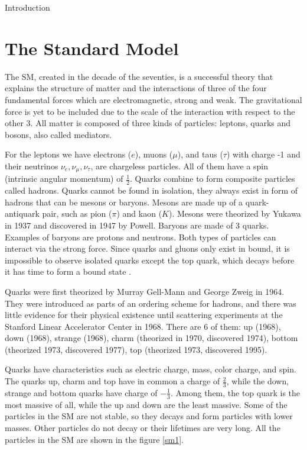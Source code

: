 \begin{chapter}{Introduction}
\section{The Standard Model} %
The SM, created in the decade of the seventies, is a successful theory that explains the structure of matter and the interactions of three of the four fundamental forces which are electromagnetic, strong and weak. The gravitational force is yet to be included due to the scale of the interaction with respect to the other 3. All matter is composed of three kinds of particles: leptons, quarks and bosons, also called mediators.

For the leptons we have electrons ($e$), muons ($\mu$), and taus ($\tau$) with charge -1 and their neutrinos $\nu_e, \nu_\mu, \nu_\tau$, are chargeless particles. %
 All of them have a spin (intrinsic angular momentum) of $\frac{1}{2}$\cite{griff}. %
 Quarks combine to form composite particles called hadrons. Quarks cannot be found in isolation, they always exist in form of hadrons that can be mesons or baryons. Mesons are made up of a quark-antiquark pair, such as pion ($\pi$) and kaon ($K$). Mesons were theorized by Yukawa in 1937 and discovered in 1947 by Powell\cite{griff}.
Baryons are made of 3 quarks. Examples of baryons are protons and neutrons. Both types of particles can interact via the strong force. Since quarks and gluons only exist in bound, it is impossible to observe isolated quarks except the top quark, which decays before it has time to form a
bound state \cite{gross}.

Quarks were first theorized by Murray Gell-Mann and 
George Zweig in 1964. They were introduced as parts of an ordering scheme for hadrons, and there was little evidence for their physical existence until scattering experiments at the Stanford Linear Accelerator Center in 1968\cite{griff}.
There are 6 of them: up (1968), down (1968), strange (1968), charm (theorized in 1970, discovered 1974), bottom (theorized 1973, discovered 1977), top (theorized 1973, discovered 1995).

Quarks have characteristics such as electric charge, mass, color charge, and spin. The quarks up, charm and top have in common a charge of $\frac{2}{3}$, while the down, strange and bottom quarks have charge of $-\frac{1}{3}$. Among them, the top quark is the most massive of all, while the up and down are the least massive. 
Some of the particles in the SM are not stable, so they decays and form particles with lower masses. Other particles do not decay or their lifetimes are very long. All the particles in the SM are shown in the figure \ref{sm1}. %


\end{chapter}
